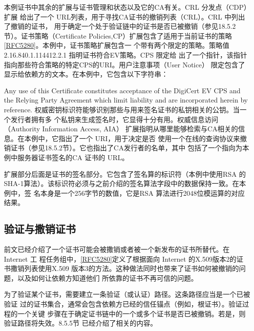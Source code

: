 本例证书中其余的扩展与证书管理和状态以及它的CA有关。CRL 分发点（CDP）扩展
给出了一个 URL列表，用于寻找CA证书的撤销列表（CRL）。CRL 中列出了撤销的证书，
用于确定一个处于验证链中的证书是否已被撤销（参见18.5.2节）。证书策略（Certificate
Policies,CP）扩展包含了适用于当前证书的策略\href{https://www.rfc-editor.org/rfc/rfc5280}{[RFC5280]}。本例中，证书策略扩展包含一
个带有两个限定的策略。策略值2.16.840.1.114412.2.1 指明证书符合EV策略。CPS 限定给
出了一个指针，该指针指向那些符合策略的特定CPS的URI。用户注意事项（User Notice）
限定包含了显示给依赖方的文本。在本例中，它包含以下字符串：

Any use of this Certificate constitutes acceptance of the DigiCert EV CPS and the Relying
Party Agreement which limit liability and are incorporated herein by reference.
权威密钥标识符能够识别那些与用来签名证书的私钥相关的公钥。当一个发行者拥有多
个私钥来生成签名时，它显得十分有用。权威信息访问（Authority Information Access, AIA）
扩展指明从哪里能够检索与CA相关的信息。在本例中，它指出了一个 URI，用于决定是否
使用一个在线的查询协议来撤销证书（参见18.5.2节）。它也指出了CA发行者的名单，其中
包括了一个指向为本例中服务器证书签名的CA 证书的 URL。

扩展部分后面是证书的签名部分。它包含了签名算的标识符（本例中使用RSA 的
SHA-1算法）。该标识符必须与之前介绍的签名算法字段中的数据保持一致。在本例中，签
名本身是一个256字节的数值，它是RSA 算法进行2048位模运算的对应结果。

\subsection{验证与撒销证书}

前文已经介绍了一个证书可能会被撒销或者被一个新发布的证书所替代。在 Internet 工
程任务组中，\href{https://www.rfc-editor.org/rfc/rfc5280}{[RFC5280]}定义了根据面向 Internet 的X.509版本2的证书撒销列表使用X.509
版本3的方法。这种做法同时也带来了证书如何被撤销的问题，以及如何让依赖方知道他们
所依靠的证书不再可信的问题。

为了验证某个证书，需要建立一条验证（或认证）路径。这条路径应当是一个已被验证
过的证书集合，通常会包含依赖方已经的信任锚点（例如，根证书）。验证过程的一个关键
步骤在于确定证书链中的一个或多个证书是否已被撤销。若是，则验证路径将失效。8.5.5节
已经介绍了相关的内容。

